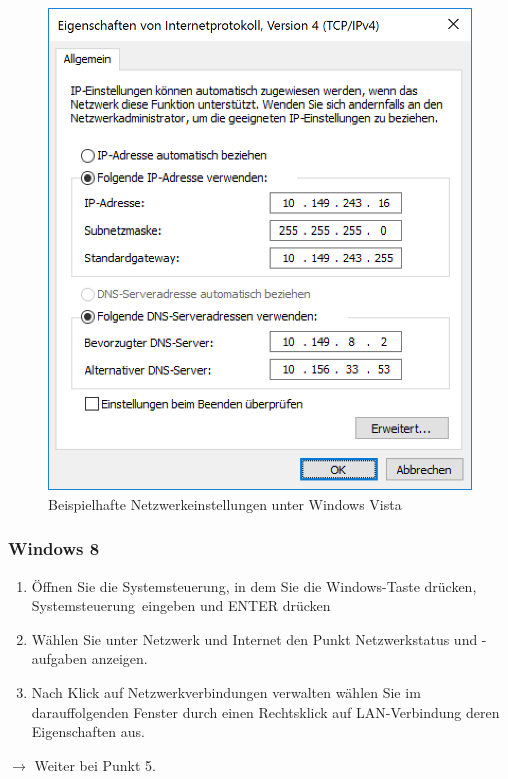 \documentclass[a4paper,12pt]{scrartcl}
\begin{document}
\begin{figure}[h!]
\begin{minipage}[c]{0.48\linewidth}
          \includegraphics[width=\linewidth,keepaspectratio]{Bilder/IP_Windows_mb}
          \caption{Beispielhafte Netzwerkeinstellungen unter Windows Vista}
        \end{minipage}
      \vspace{-20pt}
      \end{figure}
\subsubsection*{Windows 8}
\begin{enumerate}
	\item Öffnen Sie die Systemsteuerung, in dem Sie die Windows-Taste drücken, \glqq Systemsteuerung\grqq  \ eingeben und ENTER drücken
	\item Wählen Sie unter Netzwerk und Internet den Punkt Netzwerkstatus und -aufgaben anzeigen.
    \item Nach Klick auf Netzwerkverbindungen verwalten wählen Sie im darauffolgenden Fenster durch einen Rechtsklick auf LAN-Verbindung deren Eigenschaften aus.
\end{enumerate}
$\rightarrow$ Weiter bei Punkt 5.
\end{document}
